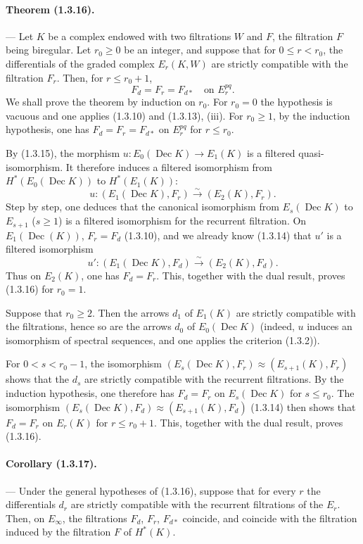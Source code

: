 \documentclass[10pt]{article}
\newcommand{\iso}{\xrightarrow{\sim}}
\newcommand{\Dec}{\operatorname{Dec}}
\begin{document}
\paragraph{Theorem (1.3.16).} --- Let $K$ be a complex endowed with two filtrations $W$ and $F$, the filtration $F$ being biregular. Let $r_0\ge0$ be an integer, and suppose that for $0\le r<r_0$, the differentials of the graded complex $E_r(K,W)$ are strictly compatible with the filtration $F_r$. Then, for $r\le r_0+1$,
\[
F_d=F_r=F_{d*}\quad\text{on }E_r^{pq}.
\]
We shall prove the theorem by induction on $r_0$. For $r_0=0$ the hypothesis is vacuous and one applies (1.3.10) and (1.3.13), (iii). For $r_0\ge1$, by the induction hypothesis, one has $F_d=F_r=F_{d*}$ on $E_r^{pq}$ for $r\le r_0$.

By (1.3.15), the morphism $u:E_0(\Dec K)\to E_1(K)$ is a filtered quasi-isomorphism. It therefore induces a filtered isomorphism from  $H^*(E_0(\Dec K))$  to $H^*(E_1(K))$:
\[
u:(E_1(\Dec K),F_r)\iso(E_2(K),F_r).
\]
Step by step, one deduces that the canonical isomorphism from $E_s(\Dec K)$ to $E_{s+1}$ ($s\ge1$) is a filtered isomorphism for the recurrent filtration. On $E_1(\Dec(K))$, $F_r=F_d$ (1.3.10), and we already know (1.3.14) that $u'$ is a filtered isomorphism
\[
u':(E_1(\Dec K),F_d)\iso(E_2(K),F_d).
\]
Thus on $E_2(K)$, one has $F_d=F_r$. This, together with the dual result, proves (1.3.16) for $r_0=1$.

Suppose that $r_0\ge2$. Then the arrows $d_1$ of $E_1(K)$ are strictly compatible with the filtrations, hence so are the arrows $d_0$ of $E_0(\Dec K)$ (indeed, $u$ induces an isomorphism of spectral sequences, and one applies the criterion (1.3.2)).

For $0<s<r_0-1$, the isomorphism $(E_s(\Dec K),F_r)\approx(E_{s+1}(K),F_r)$ shows that the $d_s$ are strictly compatible with the recurrent filtrations. By the induction hypothesis, one therefore has $F_d=F_r$ on $E_s(\Dec K)$ for $s\le r_0$. The isomorphism $(E_s(\Dec K),F_d)\approx(E_{s+1}(K),F_d)$ (1.3.14) then shows that $F_d=F_r$ on $E_r(K)$ for $r\le r_0+1$. This, together with the dual result, proves (1.3.16).

\paragraph{Corollary (1.3.17).} --- Under the general hypotheses of (1.3.16), suppose that for every $r$ the differentials $d_r$ are strictly compatible with the recurrent filtrations of the $E_r$. Then, on $E_\infty$, the filtrations $F_d$, $F_r$, $F_{d*}$ coincide, and coincide with the filtration induced by the filtration $F$ of $H^*(K)$.
\end{document}
